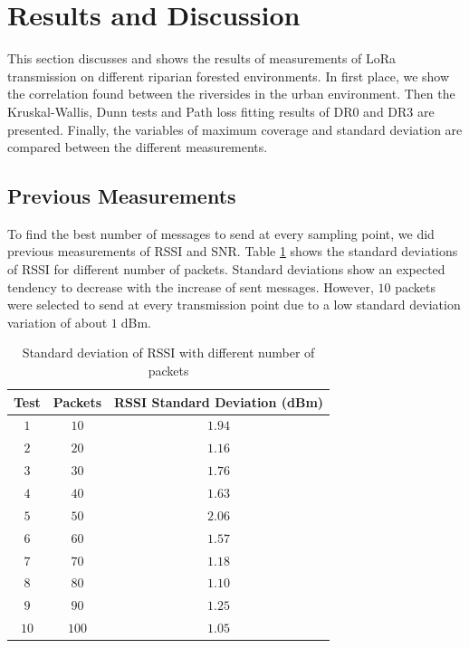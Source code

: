 \section{Results and Discussion}

This section discusses and shows the results of measurements of LoRa transmission on different riparian forested environments. In first place, we show the correlation found between the riversides in the urban environment. Then the Kruskal-Wallis, Dunn tests and Path loss fitting results of DR$0$ and DR$3$ are presented. Finally, the variables of maximum coverage and standard deviation are compared between the different measurements.  

\subsection{Previous Measurements}

To find the best number of messages to send at every sampling point, we did previous measurements of RSSI and SNR. Table \ref{tab:stdmessages} shows the standard deviations of RSSI for different number of packets. Standard deviations show an expected tendency to decrease with the increase of sent messages. However, $10$ packets were selected to send at every transmission point due to a low standard deviation variation of about $1\;$dBm. 

\begin{table}[h!]
\centering
\caption{Standard deviation of RSSI with different number of packets}
\label{tab:stdmessages}
\begin{tabular}{@{}ccc@{}}
\toprule
\textbf{Test} & \textbf{Packets} & \textbf{RSSI Standard Deviation (dBm)} \\ \midrule
$1$                    & $10$                     & $1.94$                                \\
$2$                    & $20$                     & $1.16$                                \\
$3$                    & $30$                     & $1.76$                                \\
$4$                    & $40$                     & $1.63$                                \\
$5$                    & $50$                     & $2.06$                                \\
$6$                    & $60$                     & $1.57$                                \\
$7$                    & $70$                     & $1.18$                                \\
$8$                    & $80$                     & $1.10$                                \\
$9$                    & $90$                     & $1.25$                                \\
$10$                   & $100$                    & $1.05$                                \\ \bottomrule
\end{tabular}
\end{table}

